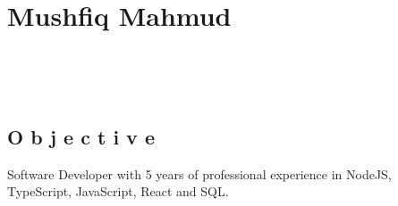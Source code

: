 \documentclass{resume}
\begin{document}

\section{Mushfiq Mahmud}

\begin{center}
	 \hspace{2mm}
	\address{Tampa, FL} \hspace{2mm}
	 \\
	\vspace{1mm}

	 \hspace{1mm}
	 \hspace{1mm}
	 \\
	\vspace{-3mm}
\end{center}


\subsection{O b j e c t i v e}
\small Software Developer with 5 years of professional experience in NodeJS, TypeScript, JavaScript, React and SQL.

%
\end{document}
